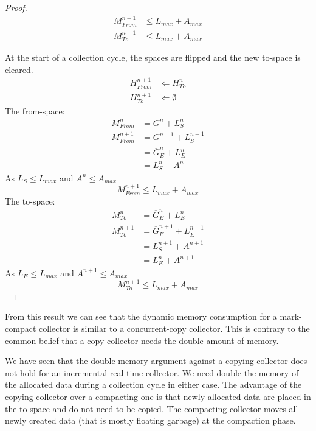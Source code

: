\begin{proof}
\begin{align}
\nonumber
    M_{From}^{n+1} & \le L_{max} + A_{max}\\
    M_{To}^{n+1}   & \le L_{max} + A_{max}
\end{align}



At the start of a collection cycle, the spaces are flipped and the
new to-space is cleared.
%
\begin{align}
\nonumber
    H_{From}^{n+1} & \Leftarrow H_{To}^n\\
    H_{To}^{n+1}   & \Leftarrow \emptyset
\end{align}
%
The from-space:
%
\begin{align}
    M_{From}^{n}  & = G^n + L_S^n\\
    M_{From}^{n+1} & = G^{n+1} + L_S^{n+1}\\
\nonumber
                   & = \overline{G}_E^n + L_E^n\\
                   & = L_S^n + A^n
\end{align}
%
As $L_S \le L_{max}$ and $A^n \le A_{max}$
%
\begin{equation}
    M_{From}^{n+1} \le L_{max} + A_{max}
\end{equation}
%
The to-space:
%
\begin{align}
    M_{To}^{n}     & = \overline{G}_E^n + L_E^n\\
    M_{To}^{n+1}   & = \overline{G}_E^{n+1} + L_E^{n+1}\\
\nonumber
                   & = L_S^{n+1} + A^{n+1}\\
                   & = L_E^{n} + A^{n+1}
\end{align}
%
%
As $L_E \le L_{max}$ and $A^{n+1} \le A_{max}$
%
\begin{equation}
    M_{To}^{n+1} \le L_{max} + A_{max}
\end{equation}
%
\end{proof}

From this result we can see that the dynamic memory consumption for a
mark-compact collector is similar to a concurrent-copy collector.
This is contrary to the common belief that a copy collector needs the
double amount of memory.

We have seen that the double-memory argument against a copying
collector does not hold for an incremental real-time collector. We
need double the memory of the allocated data during a collection
cycle in either case. The advantage of the copying collector over a
compacting one is that newly allocated data are placed in the
to-space and do not need to be copied. The compacting collector moves
all newly created data (that is mostly floating garbage) at the
compaction phase.

